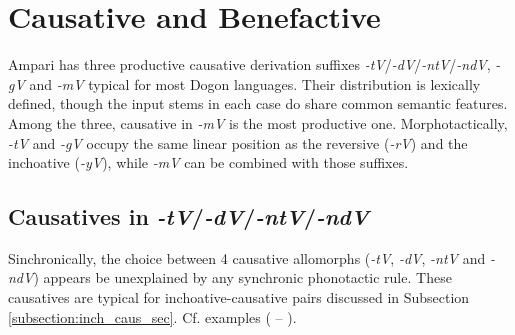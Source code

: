 
\chapter{Causative and Benefactive}
Ampari has three productive causative derivation suffixes \emph{-tV}/\emph{-dV}/\emph{-ntV}/\emph{-ndV}, \emph {-gV} and \emph {-mV} typical for most Dogon languages. Their distribution is lexically defined, though the input stems in each case do share common semantic features. Among the three, causative in \emph {-mV} is the most productive one. Morphotactically, \emph {-tV} and \emph {-gV} occupy the same linear position as the reversive (\emph{-rV}) and the inchoative (\emph {-yV}), while \emph {-mV} can be combined with those suffixes.

\section{Causatives in  \emph{-tV}/\emph{-dV}/\emph{-ntV}/\emph{-ndV}}\label{causT}
Sinchronically, the choice between 4 causative allomorphs (\emph{-tV}, \emph{-dV}, \emph{-ntV} and \emph{-ndV}) appears be unexplained by any synchronic phonotactic rule. These causatives are typical for inchoative-causative pairs discussed in Subsection \ref{subsection:inch_caus_sec}. Cf. examples ( -- ).  


\begingl

\endgl
\xe 


\begingl

\endgl
\xe 

\begingl

\endgl
\xe 

\begingl

\endgl
\xe 


